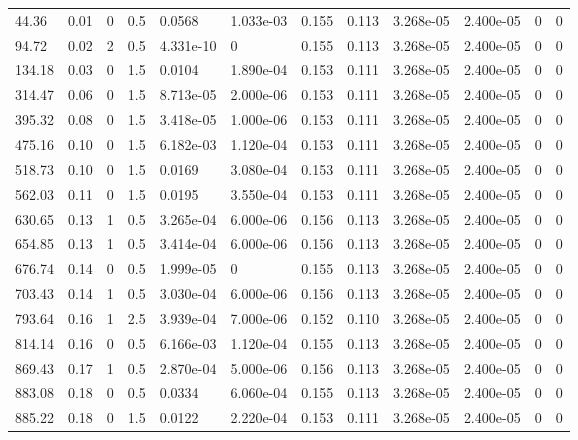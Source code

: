 \documentclass[preview]{standalone}
\begin{document}
{{\begin{tabular}{L{1.2cm}C{1.2cm} C{0.3cm}C{0.5cm} C{1.4cm}C{1.4cm} C{1.4cm}C{1.4cm} C{1.6cm}C{1.6cm} C{1.6cm}C{1.6cm}}
  44.36  &  0.01  & 0     & 0.5 &  0.0568  & 1.033e-03  &  0.155&   0.113& 3.268e-05 & 2.400e-05   &  0 & 0  \\ 
  94.72  &  0.02  & 2     & 0.5 &  4.331e-10  & 0  &  0.155&   0.113& 3.268e-05 & 2.400e-05   &  0 & 0  \\ 
  134.18  &  0.03  & 0     & 1.5 &  0.0104  & 1.890e-04  &  0.153&   0.111& 3.268e-05 & 2.400e-05   &  0 & 0  \\ 
  314.47  &  0.06  & 0     & 1.5 &  8.713e-05  & 2.000e-06  &  0.153&   0.111& 3.268e-05 & 2.400e-05   &  0 & 0  \\ 
  395.32  &  0.08  & 0     & 1.5 &  3.418e-05  & 1.000e-06  &  0.153&   0.111& 3.268e-05 & 2.400e-05   &  0 & 0  \\ 
  475.16  &  0.10  & 0     & 1.5 &  6.182e-03  & 1.120e-04  &  0.153&   0.111& 3.268e-05 & 2.400e-05   &  0 & 0  \\ 
  518.73  &  0.10  & 0     & 1.5 &  0.0169  & 3.080e-04  &  0.153&   0.111& 3.268e-05 & 2.400e-05   &  0 & 0  \\ 
  562.03  &  0.11  & 0     & 1.5 &  0.0195  & 3.550e-04  &  0.153&   0.111& 3.268e-05 & 2.400e-05   &  0 & 0  \\ 
  630.65  &  0.13  & 1     & 0.5 &  3.265e-04  & 6.000e-06  &  0.156&   0.113& 3.268e-05 & 2.400e-05   &  0 & 0  \\ 
  654.85  &  0.13  & 1     & 0.5 &  3.414e-04  & 6.000e-06  &  0.156&   0.113& 3.268e-05 & 2.400e-05   &  0 & 0  \\ 
  676.74  &  0.14  & 0     & 0.5 &  1.999e-05  & 0  &  0.155&   0.113& 3.268e-05 & 2.400e-05   &  0 & 0  \\ 
  703.43  &  0.14  & 1     & 0.5 &  3.030e-04  & 6.000e-06  &  0.156&   0.113& 3.268e-05 & 2.400e-05   &  0 & 0  \\ 
  793.64  &  0.16  & 1     & 2.5 &  3.939e-04  & 7.000e-06  &  0.152&   0.110& 3.268e-05 & 2.400e-05   &  0 & 0  \\ 
  814.14  &  0.16  & 0     & 0.5 &  6.166e-03  & 1.120e-04  &  0.155&   0.113& 3.268e-05 & 2.400e-05   &  0 & 0  \\ 
  869.43  &  0.17  & 1     & 0.5 &  2.870e-04  & 5.000e-06  &  0.156&   0.113& 3.268e-05 & 2.400e-05   &  0 & 0  \\ 
  883.08  &  0.18  & 0     & 0.5 &  0.0334  & 6.060e-04  &  0.155&   0.113& 3.268e-05 & 2.400e-05   &  0 & 0  \\ 
  885.22  &  0.18  & 0     & 1.5 &  0.0122  & 2.220e-04  &  0.153&   0.111& 3.268e-05 & 2.400e-05   &  0 & 0  \\ 

\end{tabular}}}
\end{document}
